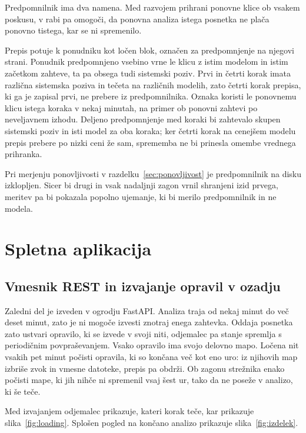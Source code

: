 \documentclass[a4paper, 12pt]{book}
\begin{document}
Predpomnilnik ima dva namena. Med razvojem prihrani ponovne klice ob vsakem
poskusu, v rabi pa omogoči, da ponovna analiza istega posnetka ne plača ponovno
tistega, kar se ni spremenilo.

Prepis potuje k ponudniku kot ločen blok, označen za predpomnjenje na njegovi
strani. Ponudnik predpomnjeno vsebino vrne le klicu z istim modelom in istim
začetkom zahteve, ta pa obsega tudi sistemski poziv. Prvi in četrti korak imata
različna sistemska poziva in tečeta na različnih modelih, zato četrti korak
prepisa, ki ga je zapisal prvi, ne prebere iz predpomnilnika. Oznaka koristi le
ponovnemu klicu istega koraka v nekaj minutah, na primer ob ponovni zahtevi po
neveljavnem izhodu. Deljeno predpomnjenje med koraki bi zahtevalo skupen
sistemski poziv in isti model za oba koraka; ker četrti korak na cenejšem modelu
prepis prebere po nizki ceni že sam, sprememba ne bi prinesla omembe vrednega
prihranka.

Pri merjenju ponovljivosti v razdelku~\ref{sec:ponovljivost} je predpomnilnik
na disku izklopljen. Sicer bi drugi in vsak nadaljnji zagon vrnil shranjeni izid
prvega, meritev pa bi pokazala popolno ujemanje, ki bi merilo predpomnilnik in ne
modela.

\section{Spletna aplikacija}
\label{sec:aplikacija}

\subsection{Vmesnik REST in izvajanje opravil v ozadju}
\label{ssec:backend}

Zaledni del je izveden v ogrodju FastAPI.
Analiza traja od nekaj minut do več deset minut, zato je ni mogoče izvesti znotraj enega zahtevka.
Oddaja posnetka zato ustvari opravilo, ki se izvede v svoji niti, odjemalec pa stanje spremlja s periodičnim povpraševanjem.
Vsako opravilo ima svojo delovno mapo. Ločena nit vsakih pet minut počisti opravila, ki so končana več kot eno uro: iz njihovih map izbriše zvok in vmesne datoteke, prepis pa obdrži. Ob zagonu strežnika enako počisti mape, ki jih nihče ni spremenil vsaj šest ur, tako da ne poseže v analizo, ki še teče.

Med izvajanjem odjemalec prikazuje, kateri korak teče, kar prikazuje
slika~\ref{fig:loading}. Splošen pogled na končano analizo prikazuje
slika~\ref{fig:izdelek}.
\end{document}
